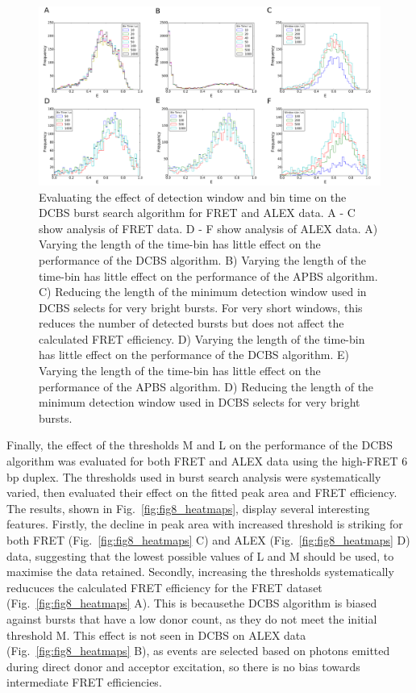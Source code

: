 \begin{figure}[!ht]
   \begin{center}
      \includegraphics*[clip=true, width=6.5in]{pyFRET/window_effect.pdf}
      \caption{Evaluating the effect of detection window and bin time on the DCBS burst search algorithm for FRET and ALEX data. A - C show analysis of FRET data. D - F show analysis of ALEX data. A) Varying the length of the time-bin has little effect on the performance of the DCBS algorithm. B) Varying the length of the time-bin has little effect on the performance of the APBS algorithm. C) Reducing the length of the minimum detection window used in DCBS selects for very bright bursts. For very short windows, this reduces the number of detected bursts but does not affect the calculated FRET efficiency. D) Varying the length of the time-bin has little effect on the performance of the DCBS algorithm. E) Varying the length of the time-bin has little effect on the performance of the APBS algorithm. D) Reducing the length of the minimum detection window used in DCBS selects for very bright bursts.}
      \label{fig:fig7_binning}
   \end{center}
\end{figure}

Finally, the effect of the thresholds M and L on the performance of the DCBS algorithm was evaluated for both FRET and ALEX data using the high-FRET 6 bp duplex.  The thresholds used in burst search analysis were systematically varied, then evaluated their effect on the fitted peak area and FRET efficiency. The results, shown in Fig.~\ref{fig:fig8_heatmaps}, display several interesting features. Firstly, the decline in peak area with increased threshold is striking for both FRET (Fig.~\ref{fig:fig8_heatmaps} C) and ALEX (Fig.~\ref{fig:fig8_heatmaps} D) data, suggesting that the lowest possible values of L and M should be used, to maximise the data retained. Secondly, increasing the thresholds systematically reducuces the calculated FRET efficiency for the FRET dataset (Fig.~\ref{fig:fig8_heatmaps} A). This is becausethe DCBS algorithm is biased against bursts that have a low donor count, as they do not meet the initial threshold M. This effect is not seen in DCBS on ALEX data (Fig.~\ref{fig:fig8_heatmaps} B), as events are selected based on photons emitted during direct donor and acceptor excitation, so there is no bias towards intermediate FRET efficiencies.

